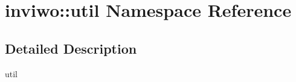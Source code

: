 \hypertarget{namespaceinviwo_1_1util}{}\section{inviwo\+:\+:util Namespace Reference}
\label{namespaceinviwo_1_1util}


\subsection{Detailed Description}
util 